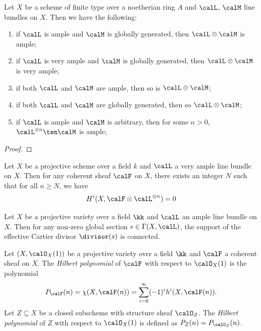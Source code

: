     \begin{proposition}\label{prop:tensor_with_ample_very_ample_and_bpf}
        Let \(X\) be a scheme of finite type over a noetherian ring \(A\) and \(\calL\), \(\calM\) line bundles on \(X\).
        Then we have the following:
        \begin{enumerate}
            \item if \(\calL\) is ample and \(\calM\) is globally generated, then \(\calL \otimes \calM\) is ample;
            \item if \(\calL\) is very ample and \(\calM\) is globally generated, then \(\calL \otimes \calM\) is very ample;
            \item if both \(\calL\) and \(\calM\) are ample, then so is \(\calL \otimes \calM\);
            \item if both \(\calL\) and \(\calM\) are globally generated, then so \(\calL \otimes \calM\);
            \item if \(\calL\) is ample and \(\calM\) is arbitrary, then for some \(n>0\), \(\calL^{\otimes n} \ten \calM\) is ample;
        \end{enumerate}
    \end{proposition}
    \begin{proof}
    \end{proof}

    \begin{theorem}\label{thm:Serre_vanishing}
        Let \(X\) be a projective scheme over a field \(k\) and \(\calL\) a very ample line bundle on \(X\). 
        Then for any coherent sheaf \(\calF\) on \(X\), there exists an integer \(N\) such that for all \(n \geq N\), we have
        \[ H^i(X, \calF \otimes \calL^{\otimes n}) = 0 \]
    \end{theorem}

    \begin{corollary}\label{cor:support_of_ample_divisor_is_connected}
        Let \(X\) be a projective variety over a field \(\kk\) and \(\calL\) an ample line bundle on \(X\).
        Then for any non-zero global section \(s \in \Gamma(X, \calL)\), the support of the effective Cartier divisor \(\divisor(s)\) is connected.
    \end{corollary}

    \begin{definition}\label{def:Hilbert_polynomial_w.r.t_ample_line_bundles}
        Let \((X,\calO_X(1))\) be a projective variety over a field \(\kk\) and \(\calF\) a coherent sheaf on \(X\).
        The \emph{Hilbert polynomial} of \(\calF\) with respect to \(\calO_X(1)\) is the polynomial 
        \[
            P_{\calF}(n) = \chi(X, \calF(n)) = \sum_{i=0}^{\infty} (-1)^i h^i(X, \calF(n)).
        \]
        Let \(Z \subseteq X\) be a closed subscheme with structure sheaf \(\calO_Z\).
        The \emph{Hilbert polynomial} of \(Z\) with respect to \(\calO_X(1)\) is defined as \(P_Z(n) = P_{\calO_Z}(n)\).
    \end{definition}


